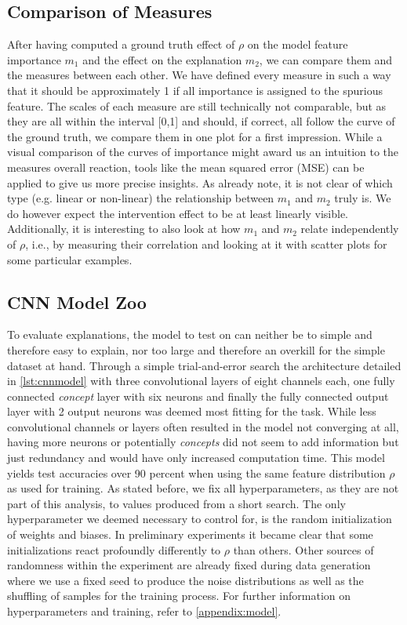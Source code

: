 \subsection{Comparison of Measures}\label{section:experiment_setup}
After having computed a ground truth effect of $\rho$ on the model feature importance $m_1$ and the effect on the explanation $m_2$, we can compare them and the measures between each other.
We have defined every measure in such a way that it should be approximately 1 if all importance is assigned to the spurious feature. The scales of each measure are still technically not comparable, but as they are all within the interval [0,1] and should, if correct, all follow the curve of the ground truth, we compare them in one plot for a first impression.
While a visual comparison of the curves of importance might award us an intuition to the measures overall reaction, tools like the mean squared error (MSE) can be applied to give us more precise insights. As \citet{Karimi2023} already note,
it is not clear of which type (e.g. linear or non-linear) the relationship between $m_1$ and $m_2$ truly is. We do however expect the intervention effect to be at least linearly visible. 
Additionally, it is interesting to also look at how $m_1$ and $m_2$ relate independently of $\rho$, i.e., by measuring their correlation and looking at it with scatter plots for some particular examples. 


\subsection{CNN Model Zoo}\label{section:model_zoo}
To evaluate explanations, the model to test on can neither be to simple and therefore easy to explain, nor too large and therefore an overkill for the simple dataset at hand.
Through a simple trial-and-error search the architecture detailed in \cref{lst:cnnmodel} with three convolutional layers of eight channels each, one fully connected \textit{concept} layer with six neurons and finally the fully connected output layer with 2 output neurons was deemed most fitting for the task. While less convolutional channels or layers often resulted in the model not converging at all, having more neurons or potentially \textit{concepts} did not seem to add information but just redundancy and would have only increased computation time.
This model yields test accuracies over 90 percent when using the same feature distribution $\rho$ as used for training. As stated before, we fix all hyperparameters, as they are not part of this analysis, to values produced from a short search.
The only hyperparameter we deemed necessary to control for, is the random initialization of weights and biases. In preliminary experiments it became clear that some initializations react profoundly differently to $\rho$ than others. Other sources of randomness within the experiment are already fixed during data generation where we use a fixed seed to produce the noise distributions as well as the shuffling of samples for the training process. 
For further information on hyperparameters and training, refer to \cref{appendix:model}.
